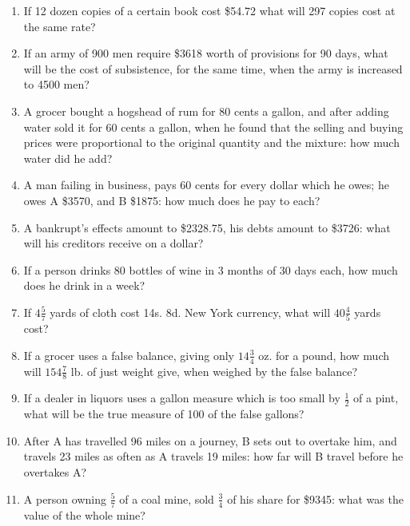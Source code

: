 \documentclass[12pt]{article}
\begin{document}
\begin{enumerate}
\item If 12 dozen copies of a certain book cost \$54.72 what will 297 copies cost at the same rate? 
\spacing

\item If an army of 900 men require \$3618 worth of provisions for 90 days, what will be the cost of subsistence, for the same time, when the army is increased to 4500 men? 
\spacing

\item A grocer bought a hogshead of rum for 80 cents a gallon, and after adding water sold it for 60 cents a gallon, when he found that the selling and buying prices were proportional to the original quantity and the mixture: how much water did he add? 
\spacing

\item A man failing in business, pays 60 cents for every dollar which he owes; he owes A \$3570, and B \$1875: how much does he pay to each? 
\spacing

\item A bankrupt's effects amount to \$2328.75, his debts amount to \$3726: what will his creditors receive on a dollar? 
\spacing

\item If a person drinks 80 bottles of wine in 3 months of 30 days each, how much does he drink in a week? 
\spacing

\item If $4\frac{5}{7}$ yards of cloth cost 14s. 8d. New York currency, what will $40\frac{4}{5}$ yards cost?  
\spacing

\item If a grocer uses a false balance, giving only $14\frac{3}{4}$ oz. for a pound, how much will $154\frac{7}{8}$ lb. of just weight give, when weighed by the false balance? 
\spacing

\item If a dealer in liquors uses a gallon measure which is too small by $\frac{1}{2}$ of a pint, what will be the true measure of 100 of the false gallons? 
\spacing

\item After A has travelled 96 miles on a journey, B sets out to overtake him, and travels 23 miles as often as A travels 19 miles: how far will B travel before he overtakes A? 
\spacing

\item A person owning $\frac{5}{7}$ of a coal mine, sold $\frac{3}{4}$ of his share for \$9345: what was the value of the whole mine? 
\spacing


\end{enumerate}
\end{document}
